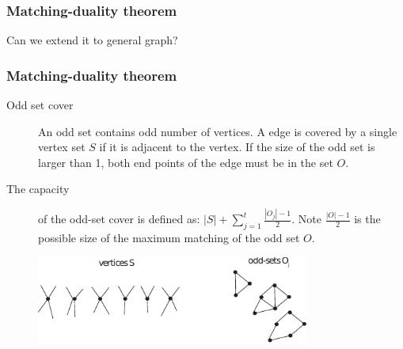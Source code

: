 \documentclass[hyperref={pdfpagelabels=false}]{beamer}
\begin{document}
{\begin{center}
\begin{figure}[h]
\begin{minipage}[c]{.45\textwidth}
		\end{minipage}
		\hfill
	\end{figure}
	\end{center}
}

\frame
{
	\frametitle{Matching-duality theorem}

	\huge{Can we extend it to general graph?}
	
}

\frame
{
	\frametitle{Matching-duality theorem}
	
	\begin{description}
	\item[Odd set cover] An odd set contains odd number of vertices. A edge is covered by a single vertex set $S$ if it is adjacent to the vertex. If the size of the odd set is larger than 1, both end points of the edge must be in the set $O$.
	\item[The capacity] of the odd-set cover is defined as: $|S| + \sum\limits_{j=1}^{t} \frac{|O_{j}| - 1}{2}$.
	Note $\frac{|O| - 1}{2}$ is the possible size of the maximum matching of the odd set $O$.
	\end{description}
	
	\begin{figure}[htb]
	\centering
	\includegraphics[width=0.8\textwidth]{figures/oddset.pdf}
	\end{figure}
}
\end{document}
